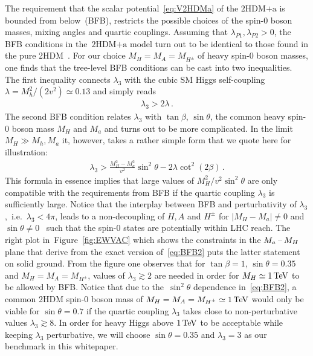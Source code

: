 \documentclass[a4paper, 11pt,notoc]{article}
\newcommand{\hdma}{\ensuremath{\textrm{2HDM+a}}\xspace}
\begin{document}
The requirement that the scalar potential~\eqref{eq:V2HDMa} of the \hdma  is bounded from below~(BFB), restricts the possible choices of the spin-0 boson masses, mixing angles and quartic couplings. Assuming that $\lambda_{P1}, \lambda_{P2} > 0$, the  BFB conditions in the~\hdma model turn out to be identical to those found in the pure 2HDM~\cite{Gunion:2002zf}. For our choice $M_H = M_A = M_{H^\pm}$ of heavy spin-0 boson masses, one finds that the tree-level BFB conditions can be cast into  two inequalities. The first inequality connects $\lambda_3$ with the cubic SM Higgs self-coupling $\lambda = M_h^2/(2 v^2) \simeq 0.13$ and simply reads   
\begin{align} \label{eq:BFB1}
\lambda_3 > 2 \lambda  \,.
\end{align}
The second BFB condition relates $\lambda_3$ with $\tan \beta$, $\sin \theta$, the common heavy  spin-0 boson  mass $M_H$ and $M_a$ and turns out to be more complicated. In the limit $M_H \gg M_h, M_a$ it, however, takes a rather simple form that we quote here for illustration: 
\begin{align} \label{eq:BFB2}
\lambda_3 > \frac{M_H^2 -M_a^2}{v^2} \sin^2 \theta  - 2 \lambda \cot^2 (2 \beta )  \,.
\end{align}
This formula in essence  implies that large values of $M_H^2/v^2 \sin^2 \theta$ are only compatible with the requirements from BFB if the quartic coupling $\lambda_3$ is sufficiently large.  Notice that the interplay between BFB and perturbativity of $\lambda_3$,~i.e.~$\lambda_3 < 4 \pi$, leads to a non-decoupling of $H, A$ and $H^\pm$ for $|M_H - M_a| \neq 0$ and $\sin \theta  \neq 0$~\cite{Goncalves:2016iyg} such that the spin-0 states are potentially within LHC reach. The right plot in~Figure~\ref{fig:EWVAC} which shows the constraints in the $M_{a}\hspace{0.5mm}$--$\hspace{0.5mm} M_H$ plane that derive from the exact version of~\eqref{eq:BFB2} puts the latter statement on solid ground. From the figure one observes that for $\tan \beta = 1$, $\sin \theta = 0.35$ and $M_H = M_A = M_{H^\pm}$, values of $\lambda_3 \gtrsim 2$ are needed in order for $M_H \simeq 1 \, {\rm TeV}$ to be allowed by BFB.  Notice that due to the~$\sin^2 \theta$ dependence in~\eqref{eq:BFB2},   a common 2HDM  spin-0 boson  mass of $M_H = M_A = M_{H^\pm} \simeq 1 \, {\rm TeV}$ would only be viable for $\sin \theta = 0.7$ if the quartic coupling $\lambda_3$ takes close to non-perturbative values $\lambda_3 \gtrsim 8$. In order for heavy Higgs above $1 \, {\rm TeV}$ to be acceptable while keeping $\lambda_3$ perturbative, we will choose $\sin \theta = 0.35$ and $\lambda_3 = 3$ as our benchmark in this whitepaper.  
\end{document}
